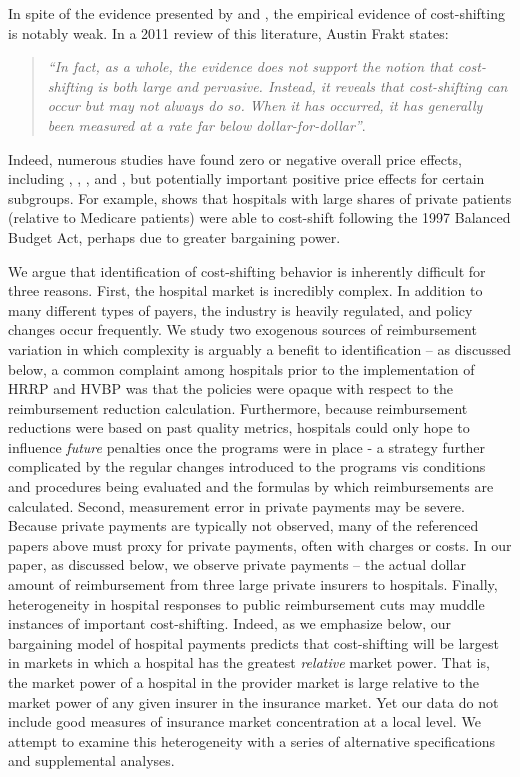 \documentclass[12pt]{article}
\begin{document}
In spite of the evidence presented by \cite{cutler1998costshift} and \cite{zwanziger2006}, the empirical evidence of cost-shifting is notably weak.  In a 2011 review of this literature, Austin Frakt states:
\begin{quote}
\textit{``In fact, as a whole, the evidence does not support the notion that cost-shifting is both large and pervasive. Instead, it reveals that cost-shifting can occur but may not always do so. When it has occurred, it has generally been measured at a rate far below dollar-for-dollar''}.
\end{quote}

Indeed, numerous studies have found zero or negative overall price effects, including \cite{dranove2008impact}, \cite{wu2010}, \cite{frakt2014}, and \cite{dranove2017}, but potentially important positive price effects for certain subgroups.  For example, \cite{wu2010} shows that hospitals with large shares of private patients (relative to Medicare patients) were able to cost-shift following the 1997 Balanced Budget Act, perhaps due to greater bargaining power.

We argue that identification of cost-shifting behavior is inherently difficult for three reasons.  First, the hospital market is incredibly complex.  In addition to many different types of payers, the industry is heavily regulated, and policy changes occur frequently.  We study two exogenous sources of reimbursement variation in which complexity is arguably a benefit to identification -- as discussed below, a common complaint among hospitals prior to the implementation of HRRP and HVBP was that the policies were opaque with respect to the reimbursement reduction calculation.  Furthermore, because reimbursement reductions were based on past quality metrics, hospitals could only hope to influence \textit{future} penalties once the programs were in place - a strategy further complicated by the regular changes introduced to the programs vis conditions and procedures being evaluated and the formulas by which reimbursements are calculated. Second, measurement error in private payments may be severe.  Because private payments are typically not observed, many of the referenced papers above must proxy for private payments, often with charges or costs.  In our paper, as discussed below, we observe private payments -- the actual dollar amount of reimbursement from three large private insurers to hospitals.  Finally, heterogeneity in hospital responses to public reimbursement cuts may muddle instances of important cost-shifting.  Indeed, as we emphasize below, our bargaining model of hospital payments predicts that cost-shifting will be largest in markets in which a hospital has the greatest \textit{relative} market power.  That is, the market power of a hospital in the provider market is large relative to the market power of any given insurer in the insurance market.  Yet our data do not include good measures of insurance market concentration at a local level.  We attempt to examine this heterogeneity with a series of alternative specifications and supplemental analyses.
\end{document}
